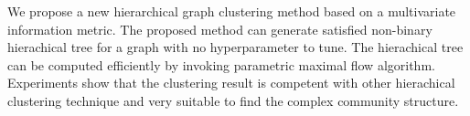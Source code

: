 We propose a new hierarchical graph clustering method based on a multivariate information metric.
The proposed method can generate satisfied non-binary hierachical tree for a graph with no hyperparameter to tune. 
The hierachical tree can be computed efficiently by 
invoking parametric maximal flow algorithm. 
Experiments show that the clustering result is competent with 
other hierachical clustering technique and very suitable to find the complex community structure.